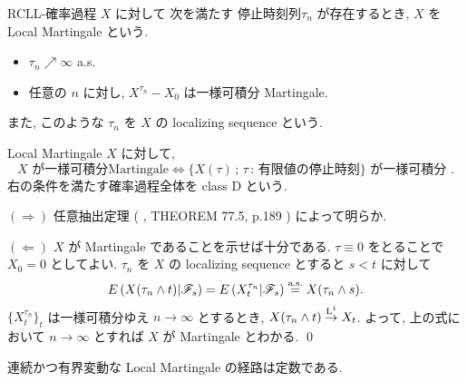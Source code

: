 \documentclass{ltjsarticle}
\begin{document}
\begin{dfn}	%
	RCLL-確率過程 \( X \) に対して 次を満たす 停止時刻列\( \tau_n \) が存在するとき,
	\( X \) を Local Martingale という.
	\begin{itemize}
		\item	\( \tau_n \nearrow \infty \) a.s.
		\item	任意の \( n \) に対し, \( X^{\tau_n} - X_0 \) は一様可積分 Martingale.
	\end{itemize}
	また, このような \( \tau_n \) を \( X \) の localizing sequence という.
\end{dfn}

\begin{thm}[Class D]\label{ClassD}
	Local Martingale \( X \) に対して,
	\[
		X \text{ が一様可積分Martingale}
		\iff
		\{ X( \tau ) \, ; \, \tau \, : \, \text{有限値の停止時刻} \}
		\text{ が一様可積分 }.
	\]
	右の条件を満たす確率過程全体を class D という.
\end{thm}

\begin{prf}
	\( ( \Rightarrow ) \)
	任意抽出定理 ( \cite{Rogers-Williams:dmm1}, THEOREM 77.5, p.189 ) によって明らか.

	\( ( \Leftarrow ) \)
	\( X \) が Martingale であることを示せば十分である.
	\( \tau \equiv 0 \) をとることで \( X_0 = 0 \) としてよい.
	\( \tau_n \) を \( X \) の localizing sequence とすると
	\( s < t \) に対して
	\[
		E \left( X( \tau_n \wedge t ) | \mathscr{F}_s \right)
		= E \left( X^{ \tau_n }_t | \mathscr{F}_s \right)
		\stackrel{ \text{a.s.} }{ = } X( \tau_n \wedge s ).
	\]
	\( \{ X^{ \tau_n }_t \}_t \) は一様可積分ゆえ \( n \to \infty \) とするとき,
	\( X( \tau_n \wedge t ) \stackrel{ \mathrm{L}^1 }{ \to } X_t \).
	よって, 上の式において \( n \to \infty \) とすれば \( X \) が Martingale とわかる.
	\qed\end{prf}


\begin{thm}[Fisk] \label{Fisk Theorem}
	連続かつ有界変動な Local Martingale の経路は定数である.
\end{thm}
\end{document}
